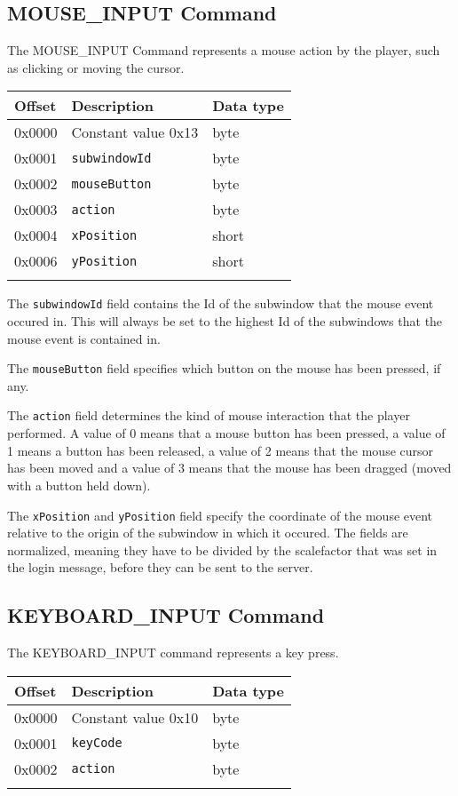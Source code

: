 \documentclass{article}
\newcommand{\field}[1]{\textcolor{fieldColor}{\texttt{#1}}}
\newenvironment{bytelisting}
{\ttfamily \begin{center} \begin{tabular}{l l l} Offset & Description & Data type \\ \hline}
{\normalfont \end{tabular} \end{center}}
\begin{document}
\subsection{MOUSE\_INPUT Command}
The MOUSE\_INPUT Command represents a mouse action by the player, such as clicking or moving the cursor.

\begin{bytelisting}
0x0000 & Constant value 0x13 & byte \\
0x0001 & \field{subwindowId} & byte \\
0x0002 & \field{mouseButton} & byte \\
0x0003 & \field{action} & byte \\
0x0004 & \field{xPosition} & short \\
0x0006 & \field{yPosition} & short \\
\end{bytelisting}

The \field{subwindowId} field contains the Id of the subwindow that the mouse event occured in. This will always be set to the highest Id of the subwindows that the mouse event is contained in.

The \field{mouseButton} field specifies which button on the mouse has been pressed, if any.

The \field{action} field determines the kind of mouse interaction that the player performed. A value of 0 means that a mouse button has been pressed, a value of 1 means a button has been released,
a value of 2 means that the mouse cursor has been moved and a value of 3 means that the mouse has been dragged (moved with a button held down).

The \field{xPosition} and \field{yPosition} field specify the coordinate of the mouse event relative to the origin of the subwindow in which it occured. The fields are normalized, meaning
they have to be divided by the scalefactor that was set in the login message, before they can be sent to the server.

\subsection{KEYBOARD\_INPUT Command}
The KEYBOARD\_INPUT command represents a key press.

\begin{bytelisting}
0x0000 & Constant value 0x10 & byte \\
0x0001 & \field{keyCode} & byte \\
0x0002 & \field{action} & byte \\
\end{bytelisting}
\end{document}
